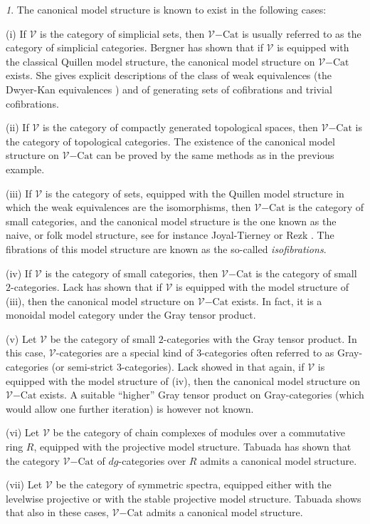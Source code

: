 \documentclass[10pt]{amsart}
\theoremstyle{plain}
\theoremstyle{remark}
\newtheorem{stit}[subsection]{}
\def\Vv{\mathcal{V}}
\def\Cat{\mathrm{Cat}}
\def\VCat{\Vv\mathrm{-}\Cat}
\begin{document}
\begin{stit}\label{known}The canonical model structure is known to exist in the following cases:\vspace{1ex}

(i) If $\Vv$ is the category of simplicial sets, then $\VCat$ is usually referred to as the category of simplicial categories. Bergner \cite{Be1} has shown that if $\Vv$ is equipped with the classical Quillen model structure, the canonical model structure on $\VCat$ exists. She gives explicit descriptions of the class of weak equivalences (the Dwyer-Kan equivalences \cite{DK}) and of generating sets of cofibrations and trivial cofibrations.

(ii) If $\Vv$ is the category of compactly generated topological spaces, then $\VCat$ is the category of topological categories. The existence of the canonical model structure on $\VCat$ can be proved by the same methods as in the previous example.

(iii) If $\Vv$ is the category of sets, equipped with the Quillen model structure in which the weak equivalences are the isomorphisms, then $\VCat$ is the category of small categories, and the canonical model structure is the one known as the naive, or folk model structure, see for instance Joyal-Tierney \cite{JT} or Rezk \cite{Re0}. The fibrations of this model structure are known as the so-called \emph{isofibrations}.

(iv) If $\Vv$ is the category of small categories, then $\VCat$ is the category of small $2$-categories. Lack \cite{La} has shown that if $\Vv$ is equipped with the model structure of (iii), then the canonical model structure on $\VCat$ exists. In fact, it is a monoidal model category under the Gray tensor product.

(v) Let $\Vv$ be the category of small $2$-categories with the Gray tensor product. In this case, $\Vv$-categories are a special kind of $3$-categories often referred to as Gray-categories (or semi-strict $3$-categories). Lack showed in \cite{La2} that again, if $\Vv$ is equipped with the model structure of (iv), then the canonical model structure on $\VCat$ exists. A suitable ``higher'' Gray tensor product on Gray-categories (which would allow one further iteration) is however not known.

(vi) Let $\Vv$ be the category of chain complexes of modules over a commutative ring $R$, equipped with the projective model structure. Tabuada \cite{Ta} has shown that the category $\VCat$ of $dg$-categories over $R$ admits a canonical model structure.

(vii) Let $\Vv$ be the category of symmetric spectra, equipped either with the levelwise projective or with the stable projective model structure. Tabuada \cite{Ta2} shows that also in these cases, $\VCat$ admits a canonical model structure.\end{stit}\vspace{1ex}
\end{document}
